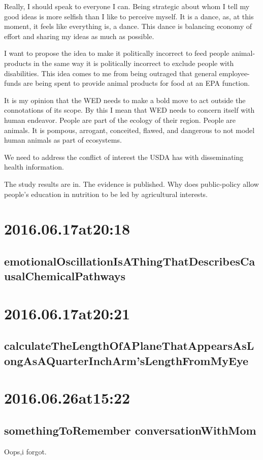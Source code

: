 \begin{enumerate}
Really, I should speak to everyone I can. Being strategic about whom I tell my good ideas is more selfish than I like to perceive myself. It is a dance, as, at this moment, it feels like everything is, a dance. This dance is balancing economy of effort and sharing my ideas as much as possible.

I want to propose the idea to make it politically incorrect to feed people animal-products in the same way it is politically incorrect to exclude people with disabilities. This idea comes to me from being outraged that general employee-funds are being spent to provide animal products for food at an EPA function.

It is my opinion that the WED needs to make a bold move to act outside the connotations of its scope. By this I mean that WED needs to concern itself with human endeavor. People are part of the ecology of their region. People are animals. It is pompous, arrogant, conceited, flawed, and dangerous to not model human animals as part of ecosystems.

We need to address the conflict of interest the USDA has with disseminating health information. 

The study results are in. The evidence is published. Why does public-policy allow people's education in nutrition to be led by agricultural interests.

\section*{ 2016.06.17at20:18 }
\subsection*{emotionalOscillationIsAThingThatDescribesCausalChemicalPathways}

\section*{ 2016.06.17at20:21 }
\subsection*{calculateTheLengthOfAPlaneThatAppearsAsLongAsAQuarterInchArm'sLengthFromMyEye}

\section*{ 2016.06.26at15:22 }
\subsection*{somethingToRemember conversationWithMom}
Oops,i forgot.


\end{enumerate}
